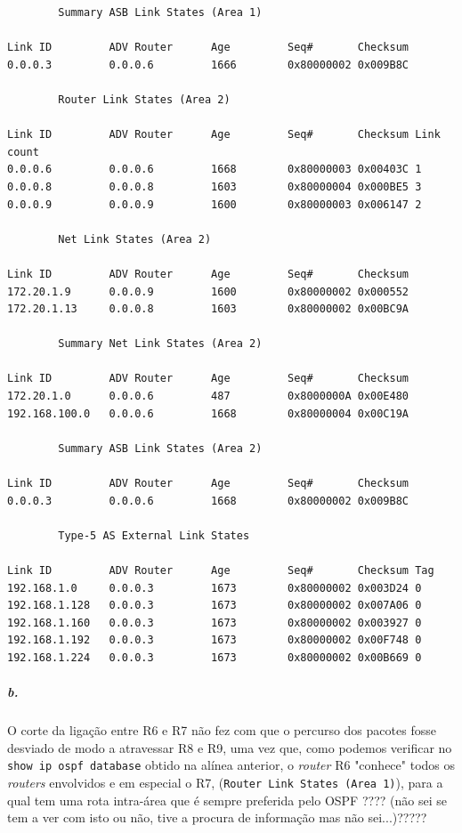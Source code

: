 \begin{verbatim}
		Summary ASB Link States (Area 1)

Link ID         ADV Router      Age         Seq#       Checksum
0.0.0.3         0.0.0.6         1666        0x80000002 0x009B8C

		Router Link States (Area 2)

Link ID         ADV Router      Age         Seq#       Checksum Link count
0.0.0.6         0.0.0.6         1668        0x80000003 0x00403C 1
0.0.0.8         0.0.0.8         1603        0x80000004 0x000BE5 3
0.0.0.9         0.0.0.9         1600        0x80000003 0x006147 2

		Net Link States (Area 2)

Link ID         ADV Router      Age         Seq#       Checksum
172.20.1.9      0.0.0.9         1600        0x80000002 0x000552
172.20.1.13     0.0.0.8         1603        0x80000002 0x00BC9A

		Summary Net Link States (Area 2)

Link ID         ADV Router      Age         Seq#       Checksum
172.20.1.0      0.0.0.6         487         0x8000000A 0x00E480
192.168.100.0   0.0.0.6         1668        0x80000004 0x00C19A

		Summary ASB Link States (Area 2)

Link ID         ADV Router      Age         Seq#       Checksum
0.0.0.3         0.0.0.6         1668        0x80000002 0x009B8C

		Type-5 AS External Link States

Link ID         ADV Router      Age         Seq#       Checksum Tag
192.168.1.0     0.0.0.3         1673        0x80000002 0x003D24 0
192.168.1.128   0.0.0.3         1673        0x80000002 0x007A06 0
192.168.1.160   0.0.0.3         1673        0x80000002 0x003927 0
192.168.1.192   0.0.0.3         1673        0x80000002 0x00F748 0
192.168.1.224   0.0.0.3         1673        0x80000002 0x00B669 0
\end{verbatim}

\subparagraph{b.}
O corte da ligação entre \textsf{R6} e \textsf{R7} não fez com que o percurso dos pacotes fosse desviado de modo a atravessar \textsf{R8} e \textsf{R9}, uma vez que, como podemos verificar no \texttt{show ip ospf database} obtido na alínea anterior, o \emph{router} \textsf{R6} "conhece" todos os \emph{routers} envolvidos e em especial o \textsf{R7}, (\texttt{Router Link States (Area 1)}), para a qual tem uma rota intra-área que é sempre preferida pelo OSPF  ???? (não sei se tem a ver com isto ou não, tive a procura de informação mas não sei...)?????

